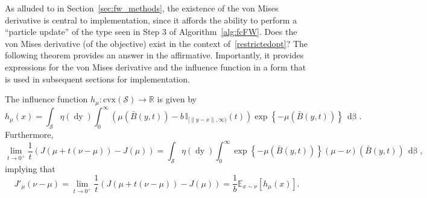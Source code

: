 \documentclass[stsy,sglanonrev]{informs4}
\newcommand{\death}{{\beta}}
\begin{document}

As alluded to in Section~\ref{sec:fw_methods}, the existence of the von Mises derivative is central to implementation, since it affords the ability to perform a ``particle update'' of the type seen in Step 3 of Algorithm~\ref{alg:fcFW}. Does the von Mises derivative (of the objective) exist in the context of~\eqref{restrictedopt}? The following theorem provides an answer in the affirmative. Importantly, it provides expressions for the von Mises derivative and the influence function in a form that is used in subsequent sections for implementation. 

\begin{theorem}\label{thm:vonMises} The influence function $h_{\mu}: \mathrm{cvx}(\mathcal{S}) \to \mathbb{R}$ is given by \begin{equation}\label{eq:influence}
    h_{\mu}(x) = \int_{\mathcal{S}} \eta(\mathop{dy}) \int_0^{\infty} \left(\mu\left(\bar{B}(y,t) \right) - b\,\mathbb{I}_{[\|y-x\|,\infty)}(t)\right) \exp\left\{-\mu\left(\bar{B}(y,t) \right) \right\} \, \mathop{d\death(t)}.
\end{equation}
Furthermore, \begin{equation}\label{vonMisesexp} \lim_{t \to 0^+} \frac{1}{t} \left( J(\mu + t(\nu - \mu)) - J(\mu) \right) = \int_{\mathcal{S}} \eta(\mathop{dy}) \int_0^{\infty} \exp\left\{-\mu\left(\bar{B}(y,t) \right) \right\} \left( \mu - \nu\right)\left(\bar{B}(y,t) \right) \, \mathop{d\death(t)},\end{equation} implying that $$J'_{\mu}(\nu-\mu) = \lim_{t \to 0^+} \frac{1}{t} \left( J(\mu + t(\nu - \mu)) - J(\mu) \right)  = \frac{1}{b}\mathbb{E}_{x \sim \nu}\left[ h_{\mu}(x)\right].$$ %
\end{theorem}
\end{document}
